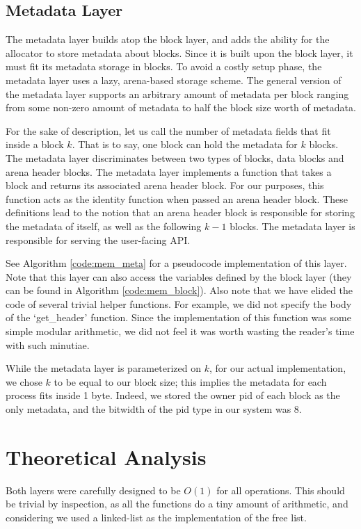 \documentclass[12pt]{report}
\begin{document}
\subsection{Metadata Layer}
    The metadata layer builds atop the block layer, and adds the ability for the
    allocator to store metadata about blocks. Since it is built upon the block
    layer, it must fit its metadata storage in blocks. To avoid a costly setup
    phase, the metadata layer uses a lazy, arena-based storage scheme. The
    general version of the metadata layer supports an arbitrary amount of
    metadata per block ranging from some non-zero amount of metadata to half the
    block size worth of metadata.

    For the sake of description, let us call the number of metadata fields that
    fit inside a block $k$. That is to say, one block can hold the metadata for
    $k$ blocks. The metadata layer discriminates between two types of blocks,
    data blocks and arena header blocks. The metadata layer implements a
    function that takes a block and returns its associated arena header block.
    For our purposes, this function acts as the identity function when passed
    an arena header block. These definitions lead to the notion that an arena
    header block is responsible for storing the metadata of itself, as well as
    the following $k-1$ blocks. The metadata layer is responsible for serving
    the user-facing API.

    See Algorithm \ref{code:mem_meta} for a pseudocode implementation of this
    layer. Note that this layer can also access the variables defined by the
    block layer (they can be found in Algorithm \ref{code:mem_block}). Also
    note that we have elided the code of several trivial helper functions. For
    example, we did not specify the body of the `get\_header' function. Since
    the implementation of this function was some simple modular arithmetic, we
    did not feel it was worth wasting the reader's time with such minutiae.

    While the metadata layer is parameterized on $k$, for our actual
    implementation, we chose $k$ to be equal to our block size; this implies
    the metadata for each process fits inside 1 byte. Indeed, we stored the
    owner pid of each block as the only metadata, and the bitwidth of the pid
    type in our system was 8.

\section{Theoretical Analysis}
    Both layers were carefully designed to be $O(1)$ for all operations. This
    should be trivial by inspection, as all the functions do a tiny amount of
    arithmetic, and considering we used a linked-list as the implementation of
    the free list.
\end{document}
